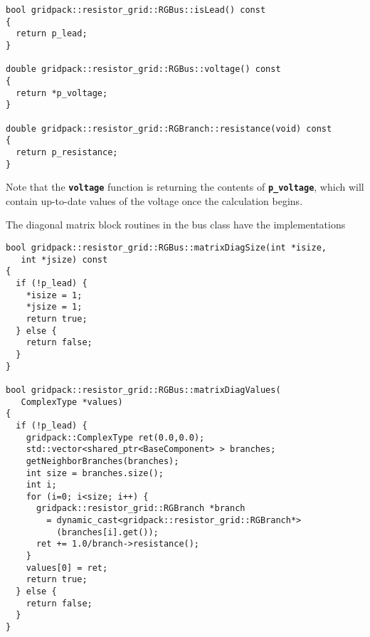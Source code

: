 {
\color{red}
\begin{Verbatim}[fontseries=b]
bool gridpack::resistor_grid::RGBus::isLead() const
{
  return p_lead;
}

double gridpack::resistor_grid::RGBus::voltage() const
{
  return *p_voltage;
}

double gridpack::resistor_grid::RGBranch::resistance(void) const
{
  return p_resistance;
}
\end{Verbatim}
}

Note that the \texttt{\textbf{voltage}} function is returning the contents of \texttt{\textbf{p\_voltage}}, which will contain up-to-date values of the voltage once the calculation begins.

The diagonal matrix block routines in the bus class have the implementations

{
\color{red}
\begin{Verbatim}[fontseries=b]
bool gridpack::resistor_grid::RGBus::matrixDiagSize(int *isize,
   int *jsize) const
{
  if (!p_lead) {
    *isize = 1;
    *jsize = 1;
    return true;
  } else {
    return false;
  }
}

bool gridpack::resistor_grid::RGBus::matrixDiagValues(
   ComplexType *values)
{
  if (!p_lead) {
    gridpack::ComplexType ret(0.0,0.0);
    std::vector<shared_ptr<BaseComponent> > branches;
    getNeighborBranches(branches);
    int size = branches.size();
    int i;
    for (i=0; i<size; i++) {
      gridpack::resistor_grid::RGBranch *branch
        = dynamic_cast<gridpack::resistor_grid::RGBranch*>
          (branches[i].get());
      ret += 1.0/branch->resistance();
    }
    values[0] = ret;
    return true;
  } else {
    return false;
  }
}
\end{Verbatim}
}

